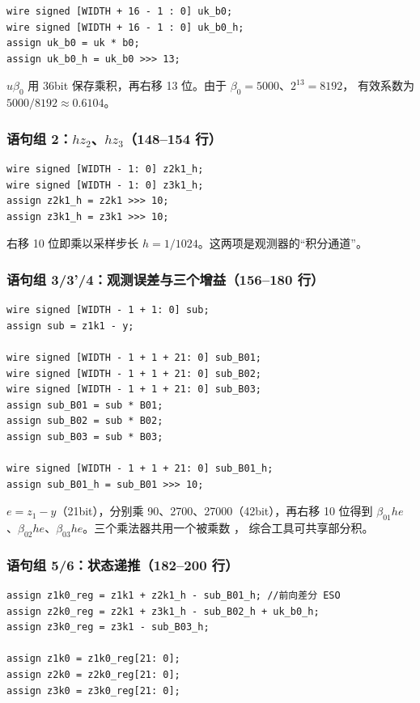 \begin{lstlisting}[style=vsnip]
wire signed [WIDTH + 16 - 1 : 0] uk_b0;
wire signed [WIDTH + 16 - 1 : 0] uk_b0_h;
assign uk_b0 = uk * b0;
assign uk_b0_h = uk_b0 >>> 13;
\end{lstlisting}

$u\beta_0$ 用 36bit 保存乘积，再右移 13 位。由于 $\beta_0=5000$、$2^{13}=8192$，
有效系数为 $5000/8192\approx0.6104$。

\subsubsection{语句组 2：$h z_2$、$h z_3$（148--154 行）}

\begin{lstlisting}[style=vsnip]
wire signed [WIDTH - 1: 0] z2k1_h;
wire signed [WIDTH - 1: 0] z3k1_h;
assign z2k1_h = z2k1 >>> 10;
assign z3k1_h = z3k1 >>> 10;
\end{lstlisting}

右移 10 位即乘以采样步长 $h=1/1024$。这两项是观测器的“积分通道”。

\subsubsection{语句组 3/3'/4：观测误差与三个增益（156--180 行）}

\begin{lstlisting}[style=vsnip]
wire signed [WIDTH - 1 + 1: 0] sub;
assign sub = z1k1 - y;

wire signed [WIDTH - 1 + 1 + 21: 0] sub_B01;
wire signed [WIDTH - 1 + 1 + 21: 0] sub_B02;
wire signed [WIDTH - 1 + 1 + 21: 0] sub_B03;
assign sub_B01 = sub * B01;
assign sub_B02 = sub * B02;
assign sub_B03 = sub * B03;

wire signed [WIDTH - 1 + 1 + 21: 0] sub_B01_h;
assign sub_B01_h = sub_B01 >>> 10;
\end{lstlisting}

$e=z_1-y$（21bit），分别乘 90、2700、27000（42bit），再右移 10 位得到
$\beta_{01}he$、$\beta_{02}he$、$\beta_{03}he$。三个乘法器共用一个被乘数 ，
综合工具可共享部分积。

\subsubsection{语句组 5/6：状态递推（182--200 行）}

\begin{lstlisting}[style=vsnip]
assign z1k0_reg = z1k1 + z2k1_h - sub_B01_h; //前向差分 ESO
assign z2k0_reg = z2k1 + z3k1_h - sub_B02_h + uk_b0_h;
assign z3k0_reg = z3k1 - sub_B03_h;

assign z1k0 = z1k0_reg[21: 0];
assign z2k0 = z2k0_reg[21: 0];
assign z3k0 = z3k0_reg[21: 0];
\end{lstlisting}

